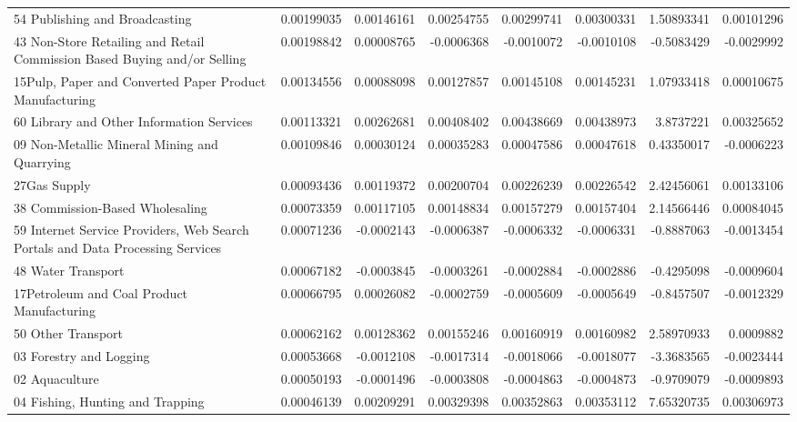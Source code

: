 \documentclass{monashthesis}
\begin{document}
\begin{table}[ht]
{\begin{tabular}{|l|r|rrrr|rr|}
    54 Publishing and Broadcasting & 0.00199035 & 0.00146161 & 0.00254755 & 0.00299741 & 0.00300331 & 1.50893341 & 0.00101296 \\
    43 Non-Store Retailing and Retail Commission Based Buying and/or Selling & 0.00198842 & 0.00008765 & -0.0006368 & -0.0010072 & -0.0010108 & -0.5083429 & -0.0029992 \\
    15Pulp, Paper and Converted Paper Product Manufacturing & 0.00134556 & 0.00088098 & 0.00127857 & 0.00145108 & 0.00145231 & 1.07933418 & 0.00010675 \\
    60 Library and Other Information Services & 0.00113321 & 0.00262681 & 0.00408402 & 0.00438669 & 0.00438973 & 3.8737221 & 0.00325652 \\
    09 Non-Metallic Mineral Mining and Quarrying & 0.00109846 & 0.00030124 & 0.00035283 & 0.00047586 & 0.00047618 & 0.43350017 & -0.0006223 \\
    27Gas Supply & 0.00093436 & 0.00119372 & 0.00200704 & 0.00226239 & 0.00226542 & 2.42456061 & 0.00133106 \\
    38 Commission-Based Wholesaling & 0.00073359 & 0.00117105 & 0.00148834 & 0.00157279 & 0.00157404 & 2.14566446 & 0.00084045 \\
    59 Internet Service Providers, Web Search Portals and Data Processing Services & 0.00071236 & -0.0002143 & -0.0006387 & -0.0006332 & -0.0006331 & -0.8887063 & -0.0013454 \\
    48 Water Transport & 0.00067182 & -0.0003845 & -0.0003261 & -0.0002884 & -0.0002886 & -0.4295098 & -0.0009604 \\
    17Petroleum and Coal Product Manufacturing & 0.00066795 & 0.00026082 & -0.0002759 & -0.0005609 & -0.0005649 & -0.8457507 & -0.0012329 \\
    50 Other Transport & 0.00062162 & 0.00128362 & 0.00155246 & 0.00160919 & 0.00160982 & 2.58970933 & 0.0009882 \\
    03 Forestry and Logging & 0.00053668 & -0.0012108 & -0.0017314 & -0.0018066 & -0.0018077 & -3.3683565 & -0.0023444 \\
    02 Aquaculture & 0.00050193 & -0.0001496 & -0.0003808 & -0.0004863 & -0.0004873 & -0.9709079 & -0.0009893 \\
    04 Fishing, Hunting and Trapping & 0.00046139 & 0.00209291 & 0.00329398 & 0.00352863 & 0.00353112 & 7.65320735 & 0.00306973 \\
    \hline\hline 
    \end{tabular}} 
    \begin{tablenotes} 
      \footnotesize

\end{tablenotes}
\end{table}
\end{document}
